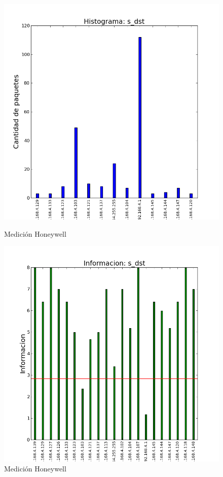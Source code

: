 \begin{figure}[H]
   \begin{minipage}{0.5\linewidth}
     \includegraphics[width=\linewidth]{../imgs/prueba_laburo-ips_s_dst_hist.png}
     \caption{Medición Honeywell}\label{fig:Honeywell-dst-hist}
   \end{minipage}
  \hfill
   \begin{minipage}{0.5\linewidth}
     \includegraphics[width=\linewidth]{../imgs/prueba_laburo-ips_s_dst_info.png}
     \caption{Medición Honeywell}\label{fig:Honeywell-dst-info}
   \end{minipage}
 \end{figure}

